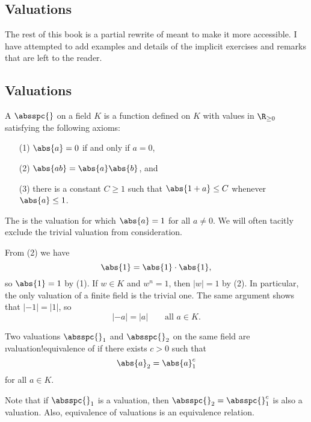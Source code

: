 \documentclass[11pt]{book}
\begin{document}
\begin{ch}
\chapter{Valuations}
The rest of this book is a partial rewrite of \cite{cassels:global}
meant to make it more accessible.  I have attempted to add examples
and details of the implicit exercises and remarks that are left to the
reader.

\section{Valuations}

\begin{definition}[Valuation]
A  $\absspc{}$ on a field $K$ is a function
defined on $K$ with values in $\R_{\geq 0}$ satisfying
the following axioms:
\begin{enumerate}
\item[(1)] $\abs{a} = 0$ if and only if $a = 0$,
\item[(2)] $\abs{ab}=\abs{a}\abs{b}$, and
\item[(3)] there is a constant $C\geq 1$ such that
$\abs{1+a}\leq C$ whenever $\abs{a}\leq 1$.
\end{enumerate}
\end{definition}

The  is the valuation for which
$\abs{a}=1$ for all $a\neq 0$.  We will often tacitly
exclude the trivial valuation from consideration.

From (2) we have
$$
  \abs{1} = \abs{1}\cdot \abs{1},
$$
so $\abs{1} = 1$ by (1).
If $w\in K$ and $w^n=1$, then $|w|=1$ by (2).
In particular, the only valuation of a finite field
is the trivial one.    The same argument shows that $|-1|=|1|$,
so
$$
  |-a| = |a|\qquad \text{all }a \in K.
$$

\begin{definition}[Equivalent]
Two valuations $\absspc{}_1$ and $\absspc{}_2$ on the
same field are \i{valuation!equivalence of}
if there exists $c>0$ such
that $$\abs{a}_2 = \abs{a}_1^c$$
for all $a\in K$.
\end{definition}
Note that if $\absspc{}_1$ is a valuation, then
$\absspc{}_2=\absspc{}_1^c$ is also a valuation.
Also, equivalence of valuations is an equivalence relation.


\end{ch}
\end{document}
